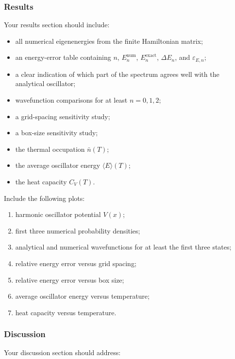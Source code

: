 \subsubsection{Results}

Your results section should include:

\begin{itemize}
    \item all numerical eigenenergies from the finite Hamiltonian matrix;
    \item an energy-error table containing \(n\), \(E_n^{\mathrm{num}}\), \(E_n^{\mathrm{exact}}\), \(\Delta E_n\), and \(\varepsilon_{E,n}\);
    \item a clear indication of which part of the spectrum agrees well with the analytical oscillator;
    \item wavefunction comparisons for at least \(n=0,1,2\);
    \item a grid-spacing sensitivity study;
    \item a box-size sensitivity study;
    \item the thermal occupation \(\bar{n}(T)\);
    \item the average oscillator energy \(\langle E\rangle(T)\);
    \item the heat capacity \(C_V(T)\).
\end{itemize}

Include the following plots:

\begin{enumerate}
    \item harmonic oscillator potential \(V(x)\);
    \item first three numerical probability densities;
    \item analytical and numerical wavefunctions for at least the first three states;
    \item relative energy error versus grid spacing;
    \item relative energy error versus box size;
    \item average oscillator energy versus temperature;
    \item heat capacity versus temperature.
\end{enumerate}

\subsubsection{Discussion}

Your discussion section should address:

